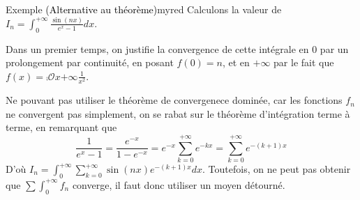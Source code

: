     \begin{omed}{Exemple \textcolor{black}{(Alternative au théorème)}}{myred}
        Calculons la valeur de $I_n = \int_{0}^{+\infty} \frac{\sin(nx)}{e^x - 1}dx$.

        Dans un premier temps, on justifie la convergence de cette intégrale en $0$ par un prolongement par continuité, en posant $f(0) = n$, et en $+\infty$ par le fait que $f(x) = \comp{\mathcal{O}}{x}{+\infty}{\frac{1}{x^2}}$.

        Ne pouvant pas utiliser le théorème de convergenece dominée, car les fonctions $f_n$ ne convergent pas simplement, on se rabat sur le théorème d’intégration terme à terme, en remarquant que 
        \[ \frac{1}{e^x - 1} = \frac{e^{-x}}{1 - e^{-x}} = e^{-x} \sum_{k=0}^{+\infty} e^{-kx} = \sum_{k=0}^{+\infty} e^{-(k+1)x} \]   
        D’où $I_n = \int_{0}^{+\infty} \sum_{k=0}^{+\infty} \sin(nx) e^{-(k+1)x} dx$. Toutefois, on ne peut pas obtenir que $\sum \int_{0}^{+\infty} f_n$ converge, il faut donc utiliser un moyen détourné.


\end{omed}
